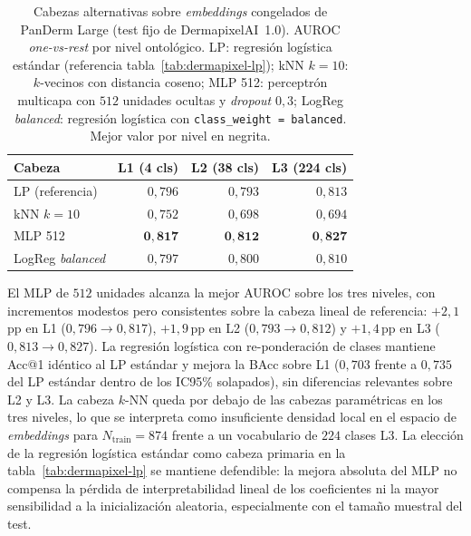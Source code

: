 \begin{table}[H]
\centering
\footnotesize
\setlength{\tabcolsep}{4pt}
\renewcommand{\arraystretch}{0.95}
\caption{Cabezas alternativas sobre \emph{embeddings} congelados de
PanDerm Large (test fijo de DermapixelAI~1.0). AUROC
\emph{one-vs-rest} por nivel ontológico. LP: regresión logística
estándar (referencia tabla~\ref{tab:dermapixel-lp}); kNN $k=10$:
$k$-vecinos con distancia coseno; MLP 512: perceptrón multicapa
con $512$ unidades ocultas y \emph{dropout} $0{,}3$; LogReg
\emph{balanced}: regresión logística con \texttt{class\_weight =
balanced}. Mejor valor por nivel en negrita.}
\label{tab:dermapixel-heads}
\begin{tabular}{lrrr}
\hline
Cabeza                & L1 (4 cls)         & L2 (38 cls)        & L3 (224 cls) \\
\hline
LP (referencia)       & $0{,}796$          & $0{,}793$          & $0{,}813$ \\
kNN $k=10$            & $0{,}752$          & $0{,}698$          & $0{,}694$ \\
MLP 512               & $\mathbf{0{,}817}$ & $\mathbf{0{,}812}$ & $\mathbf{0{,}827}$ \\
LogReg \emph{balanced}& $0{,}797$          & $0{,}800$          & $0{,}810$ \\
\hline
\end{tabular}
\end{table}

El MLP de $512$ unidades alcanza la mejor AUROC sobre los tres
niveles, con incrementos modestos pero consistentes sobre la cabeza
lineal de referencia: $+2{,}1$\,pp en L1
($0{,}796 \to 0{,}817$), $+1{,}9$\,pp en L2
($0{,}793 \to 0{,}812$) y $+1{,}4$\,pp en L3
($0{,}813 \to 0{,}827$). La regresión logística con re-ponderación
de clases mantiene Acc@1 idéntico al LP estándar y mejora la BAcc
sobre L1 ($0{,}703$ frente a $0{,}735$ del LP estándar dentro de
los IC95\% solapados), sin diferencias relevantes sobre L2 y L3.
La cabeza $k$-NN queda por debajo de las cabezas paramétricas en
los tres niveles, lo que se interpreta como insuficiente densidad
local en el espacio de \emph{embeddings} para $N_{\mathrm{train}}
= 874$ frente a un vocabulario de $224$ clases L3. La elección de
la regresión logística estándar como cabeza primaria en la
tabla~\ref{tab:dermapixel-lp} se mantiene defendible: la mejora
absoluta del MLP no compensa la pérdida de interpretabilidad
lineal de los coeficientes ni la mayor sensibilidad a la
inicialización aleatoria, especialmente con el tamaño muestral del
test.


